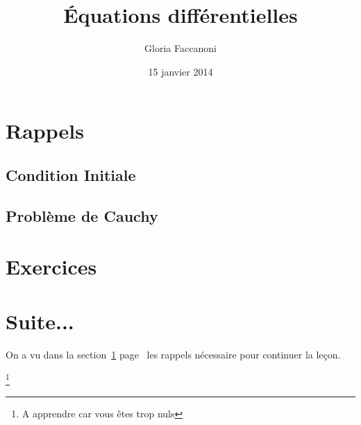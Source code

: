 \documentclass[12pt,a4paper]{scrartcl}
\title{Équations différentielles}
\author{Gloria Faccanoni}
\date{15 janvier 2014}
\theoremstyle{plain}
\begin{document}
\maketitle

\begin{abstract}
\lipsum[1][1-5]
\end{abstract}

\tableofcontents

\lipsum[1-2]

\section{Rappels}
\label{eti}
\lipsum[3]

\subsection{Condition Initiale}
\lipsum[3]

\subsection{Problème de Cauchy}
\lipsum[4]

\section{Exercices}
\lipsum[7]

\section{Suite...}
On a vu dans la section~\ref{eti} page~\pageref{eti} les rappels nécessaire pour continuer la leçon.

\footnote
{A apprendre car vous êtes trop nuls}
\end{document}
